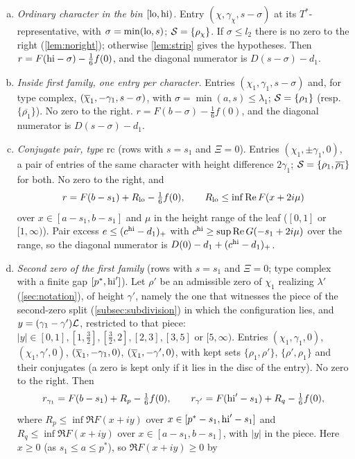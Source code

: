\begin{enumerate}[(a)]
  \item \emph{Ordinary character in the bin $[\mathrm{lo},\mathrm{hi})$.} Entry $(\chi,\gamma_\chi,s-\sigma)$ at its
    $T^*$-representative, with $\sigma=\min(\mathrm{lo},s)$; $\mathcal{S}=\{\rho_\chi\}$. If $\sigma\le l_2$ there is no
    zero to the right (\cref{lem:noright}); otherwise \cref{lem:strip} gives the hypotheses. Then
    $r=F(\mathrm{hi}-\sigma)-\frac16f(0)$, and the diagonal numerator is $D(s-\sigma)-d_1$.
  \item \emph{Inside first family, one entry per character.} Entries $(\chi_1,\gamma_1,s-\sigma)$ and, for
    type $\mathrm{complex}$, $(\overline{\chi}_1,-\gamma_1,s-\sigma)$, with $\sigma=\min(a,s)\le\lambda_1$; $\mathcal{S}=\{\rho_1\}$
    (resp.\ $\{\overline{\rho_1}\}$). No zero to the right. $r=F(b-\sigma)-\frac16f(0)$, and the diagonal
    numerator is $D(s-\sigma)-d_1$.
  \item \emph{Conjugate pair, type $\mathrm{rc}$} (rows with $s=s_1$ and $\Xi=0$). Entries
    $(\chi_1,\pm\gamma_1,0)$, a pair of entries of the same character with height difference
    $2\gamma_1$; $\mathcal{S}=\{\rho_1,\overline{\rho_1}\}$ for both. No zero to the right, and
    \[
      r=F(b-s_1)+R_{\mathrm{lo}}-\tfrac16f(0),\qquad R_{\mathrm{lo}}\le\inf\operatorname{Re} F(x+2i\mu)
    \]
    over $x\in[a-s_1,b-s_1]$ and $\mu$ in the height range of the leaf ($[0,1]$ or $[1,\infty)$). Pair
    excess $e\le(c^{\mathrm{hi}}-d_1)_+$ with $c^{\mathrm{hi}}\ge\sup\operatorname{Re} G(-s_1+2i\mu)$ over the range, so the diagonal numerator
    is $D(0)-d_1+(c^{\mathrm{hi}}-d_1)_+$.
  \item \emph{Second zero of the first family} (rows with $s=s_1$ and $\Xi=0$; type $\mathrm{complex}$
    with a finite gap $[p^*,\mathrm{hi}']$). Let $\rho'$ be an admissible zero of $\chi_1$ realizing $\lambda'$
    (\cref{sec:notation}), of height $\gamma'$, namely the one that witnesses the piece of the second-zero split
    (\cref{subsec:subdivision}) in which the configuration lies, and $y=(\gamma_1-\gamma')\mathcal{L}$, restricted to that
    piece: $|y|\in[0,1],[1,\frac32],[\frac32,2],[2,3],[3,5]$ or $[5,\infty)$.
    Entries $(\chi_1,\gamma_1,0)$, $(\chi_1,\gamma',0)$, $(\overline{\chi}_1,-\gamma_1,0)$, $(\overline{\chi}_1,-\gamma',0)$, with kept sets
    $\{\rho_1,\rho'\}$, $\{\rho',\rho_1\}$ and their conjugates (a zero is kept only if it lies in the
    disc of the entry). No zero to the right. Then
    \[
      r_{\gamma_1}=F(b-s_1)+R_p-\tfrac16f(0),\qquad r_{\gamma'}=F(\mathrm{hi}'-s_1)+R_q-\tfrac16f(0),
    \]
    where $R_p\le\inf\Re F(x+iy)$ over $x\in[p^*-s_1,\mathrm{hi}'-s_1]$ and $R_q\le\inf\Re F(x+iy)$ over
    $x\in[a-s_1,b-s_1]$, with $|y|$ in the piece. Here $x\ge0$ (as $s_1\le a\le p^*$), so $\Re F(x+iy)\ge0$ by

\end{enumerate}
